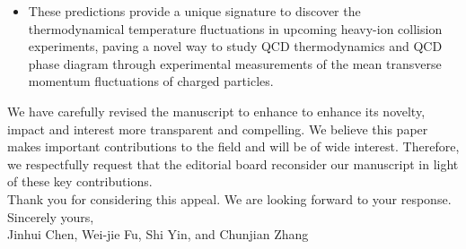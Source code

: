 \documentclass[a4paper,11pt, oneside,titlepage]{article}
\begin{document}
\begin{itemize}
\item[$\bullet$] These predictions provide a unique signature to discover the thermodynamical temperature fluctuations in upcoming heavy-ion collision experiments, paving a novel way to study QCD thermodynamics and QCD phase diagram through experimental measurements of the mean transverse momentum fluctuations of charged particles. \\[-1.5ex] 

\end{itemize}

\noindent We have carefully revised the manuscript to enhance to enhance its novelty, impact and interest more transparent and compelling. We believe this paper makes important contributions to the field and will be of wide interest. Therefore, we respectfully request that the editorial board reconsider our manuscript in light of these key contributions.  \\

\noindent Thank you for considering this appeal. We are looking forward to your response.\\


\noindent Sincerely yours, \\[0.3ex]

\noindent Jinhui Chen, Wei-jie Fu, Shi Yin, and Chunjian Zhang

\noindent 




\end{document}
